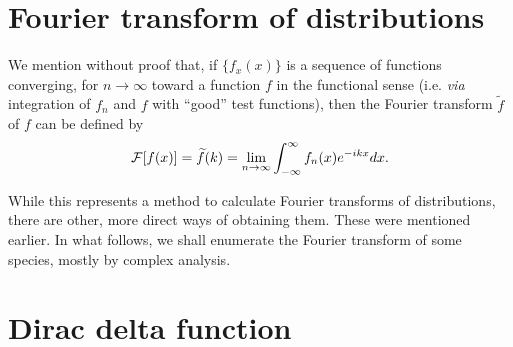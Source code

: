\section{Fourier transform  of distributions}
\label{2012-m-ch-di-ftgeneraldefcon}

We mention without proof that, if $\{ f_x(x)\}$ is a sequence of functions converging, for $n\rightarrow \infty$
toward a function $f$ in the functional sense (i.e. {\it via}
integration of $f_n$ and $f$ with ``good'' test functions),
then the Fourier transform $\widetilde f$ of $f$ can be defined by \cite{Lighthill,Howell,doi:10.1080/0020739900210418}
\begin{equation}
\begin{split}
 {\cal F}[f(x)]=\widetilde{f}(k)= \lim_{n\rightarrow \infty}
 \int_{-\infty}^\infty  f_n(x) e^{-i{kx}} dx
.
\end{split}
\end{equation}

While this represents a method to calculate  Fourier transforms of distributions, there are other, more direct ways of
obtaining them.
These were mentioned earlier.
In what follows, we shall enumerate the Fourier transform of some species, mostly by complex analysis.




\section{Dirac  delta function}




